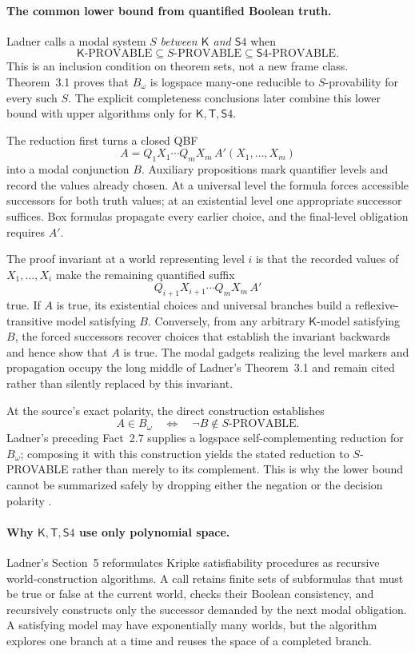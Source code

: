 \paragraph{The common lower bound from quantified Boolean truth.}
Ladner calls a modal system \(S\) \emph{between \(\mathsf K\) and
\(\mathsf S4\)} when
\[
 \mathsf K\text{-PROVABLE}
 \subseteq S\text{-PROVABLE}
 \subseteq \mathsf S4\text{-PROVABLE}.
\]
This is an inclusion condition on theorem sets, not a new frame class.
Theorem~3.1 proves that \(B_\omega\) is logspace many-one reducible to
\(S\)-provability for every such \(S\).  The explicit completeness conclusions
later combine this lower bound with upper algorithms only for
\(\mathsf K,\mathsf T,\mathsf S4\).

The reduction first turns a closed QBF
\[
 A=Q_1X_1\cdots Q_mX_m\,A'(X_1,\ldots,X_m)
\]
into a modal conjunction \(B\).  Auxiliary propositions mark quantifier levels
and record the values already chosen.  At a universal level the formula forces
accessible successors for both truth values; at an existential level one
appropriate successor suffices.  Box formulas propagate every earlier choice,
and the final-level obligation requires \(A'\).

The proof invariant at a world representing level \(i\) is that the recorded
values of \(X_1,\ldots,X_i\) make the remaining quantified suffix
\[
 Q_{i+1}X_{i+1}\cdots Q_mX_m\,A'
\]
true.  If \(A\) is true, its existential choices and universal branches build a
reflexive-transitive model satisfying \(B\).  Conversely, from any arbitrary
\(\mathsf K\)-model satisfying \(B\), the forced successors recover choices
that establish the invariant backwards and hence show that \(A\) is true.
The modal gadgets realizing the level markers and propagation occupy the long
middle of Ladner's Theorem~3.1 and remain cited rather than silently replaced
by this invariant.

At the source's exact polarity, the direct construction establishes
\[
 A\in B_\omega
 \quad\Longleftrightarrow\quad
 \neg B\notin S\text{-PROVABLE}.
\]
Ladner's preceding Fact~2.7 supplies a logspace self-complementing reduction
for \(B_\omega\); composing it with this construction yields the stated
reduction to \(S\)-PROVABLE rather than merely to its complement.  This is why
the lower bound cannot be summarized safely by dropping either the negation or
the decision polarity \cite[thm.~3.1]{Ladner1977}.

\paragraph{Why \(\mathsf K,\mathsf T,\mathsf S4\) use only polynomial space.}
Ladner's Section~5 reformulates Kripke satisfiability procedures as recursive
world-construction algorithms.  A call retains finite sets of subformulas that
must be true or false at the current world, checks their Boolean consistency,
and recursively constructs only the successor demanded by the next modal
obligation.  A satisfying model may have exponentially many worlds, but the
algorithm explores one branch at a time and reuses the space of a completed
branch.

